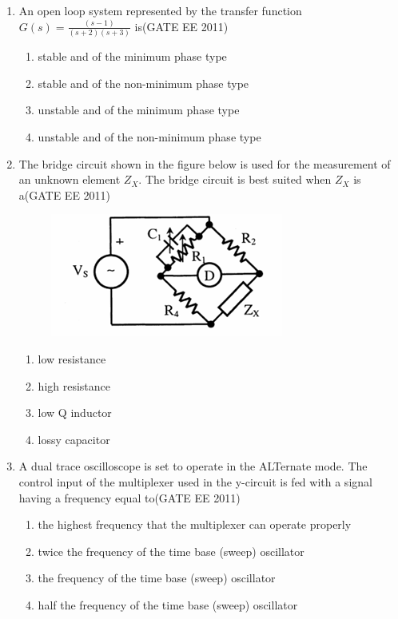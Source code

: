\documentclass[a4paper,10pt]{exam}
\theoremstyle{remark}
\begin{document}
\begin{enumerate}
\item An open loop system represented by the transfer function $G(s)=\frac{(s-1)}{(s+2)(s+3)}$ is\hfill{(GATE EE 2011)}
\begin{multicols}{2}
\begin{enumerate}
  \item stable and of the minimum phase type
  \item stable and of the non-minimum phase type
  \item unstable and of the minimum phase type
  \item unstable and of the non-minimum phase type
\end{enumerate}
\end{multicols}

\item The bridge circuit shown in the figure below is used for the measurement of an unknown element $Z_{X}$. The bridge circuit is best suited when $Z_{X}$ is a\hfill{(GATE EE 2011)}
\begin{figure}[H]
    \centering
    \includegraphics[width=0.4\columnwidth]{figs/Q 22.png}\caption{}     \label{fig:myfigure}
\end{figure}
\begin{multicols}{4}
\begin{enumerate}
  \item low resistance
  \item high resistance
  \item low Q inductor
  \item lossy capacitor
\end{enumerate}
\end{multicols}

\item A dual trace oscilloscope is set to operate in the ALTernate mode. The control input of the multiplexer used in the y-circuit is fed with a signal having a frequency equal to\hfill{(GATE EE 2011)}

\begin{enumerate}
  \item the highest frequency that the multiplexer can operate properly
  \item twice the frequency of the time base (sweep) oscillator
  \item the frequency of the time base (sweep) oscillator
  \item half the frequency of the time base (sweep) oscillator
\end{enumerate}



\end{enumerate}
\end{document}
